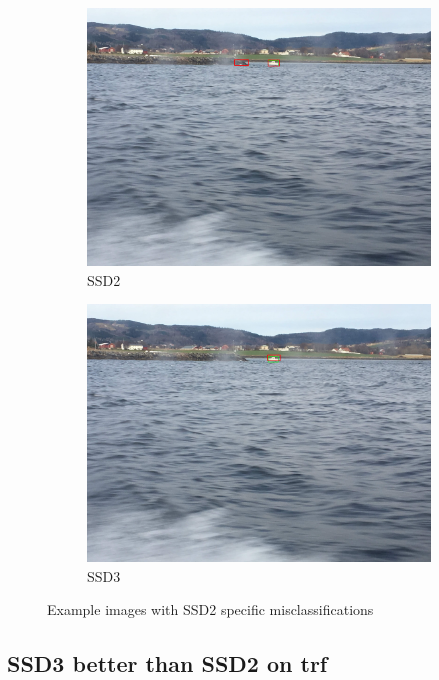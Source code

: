 \begin{figure}[h!]
\begin{subfigure}{.5\textwidth}
  \centering
  \includegraphics[width=0.75\linewidth]{results/case_buildings/ssdtrf/ssd2/grov2/IMG_2421.jpg}
  \caption{SSD2}
\end{subfigure}%
\begin{subfigure}{.5\textwidth}
  \centering
  \includegraphics[width=.75\linewidth]{results/case_buildings/ssdtrf/ssd3/grov2/IMG_2421.jpg}
  \caption{SSD3}
\end{subfigure}
\caption{Example images with SSD2 specific misclassifications}
\label{img:ssd_trf_grov2}
\end{figure}

\newpage

\subsection{SSD3 better than SSD2 on trf}
\label{sec_ssd3_better_trf}

